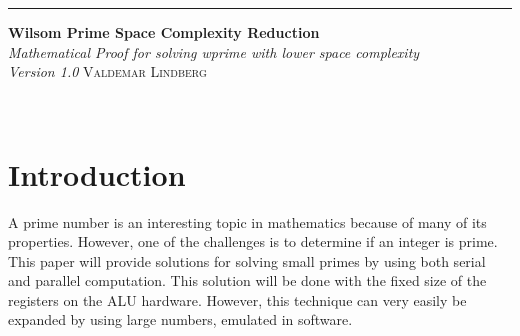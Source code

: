 \documentclass[12pt, oneside, onecolumn]{article}
\begin{document}
\begin{titlepage} %
	
	\raggedleft %
	
	\rule{1pt}{\textheight} %
	\hspace{0.05\textwidth} %
	\parbox[b]{0.75\textwidth}{ %
		
		{\Huge\bfseries Wilsom Prime Space Complexity Reduction}\\[2\baselineskip] %
		{\large\textit{Mathematical Proof for solving wprime with lower space complexity}}\\[4\baselineskip] %
		{\large\textit{Version 1.0}}
		{\Large\textsc{Valdemar Lindberg}} %
		
		\vspace{0.5\textheight} %
		
		{\noindent }\\[\baselineskip] %
	}

\end{titlepage}

\newpage
{} %

\tableofcontents
\newpage
{} %

% 
\section{Introduction}
A prime number is an interesting topic in mathematics because of many of its properties. However, one of the challenges is to determine if an integer is prime. This paper will provide solutions for solving small primes by using both serial and parallel computation. This solution will be done with the fixed size of the registers on the ALU hardware. However, this technique can very easily be expanded by using large numbers, emulated in software.
\end{document}
